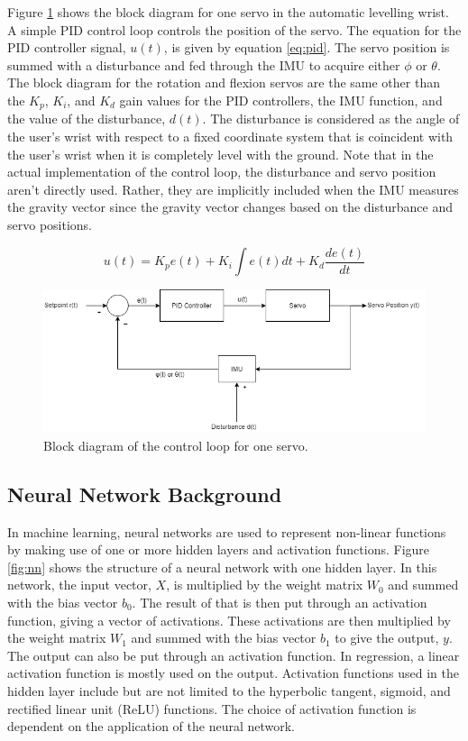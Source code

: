 \documentclass[letterpaper,12pt]{article}
\begin{document}
Figure \ref{fig:servo_system} shows the block diagram for one servo in the automatic levelling wrist. A simple PID control loop controls the position of the servo. The equation for the PID controller signal, $u(t)$, is given by equation \ref{eq:pid}. The servo position is summed with a disturbance and fed through the IMU to acquire either $\phi$ or $\theta$. The block diagram for the rotation and flexion servos are the same other than the $K_p$, $K_i$, and $K_d$ gain values for the PID controllers, the IMU function, and the value of the disturbance, $d(t)$. The disturbance is considered as the angle of the user's wrist with respect to a fixed coordinate system that is coincident with the user's wrist when it is completely level with the ground. Note that in the actual implementation of the control loop, the disturbance and servo position aren't directly used. Rather, they are implicitly included when the IMU measures the gravity vector since the gravity vector changes based on the disturbance and servo positions.

\begin{equation}
	\label{eq:pid}
	u(t) = K_p e(t) + K_i \int e(t) dt + K_d \frac{de(t)}{dt}
\end{equation}

\begin{figure}[H]
\centering \includegraphics[width=0.8\columnwidth]{servo_system.png}
\caption{\label{fig:servo_system}Block diagram of the control loop for one servo.}
\end{figure}

\subsection{Neural Network Background}
In machine learning, neural networks are used to represent non-linear functions by making use of one or more hidden layers and activation functions. Figure \ref{fig:nn} shows the structure of a neural network with one hidden layer. In this network, the input vector, $X$, is multiplied by the weight matrix $W_{0}$ and summed with the bias vector $b_{0}$. The result of that is then put through an activation function, giving a vector of activations. These activations are then multiplied by the weight matrix $W_{1}$ and summed with the bias vector $b_{1}$ to give the output, $y$. The output can also be put through an activation function. In regression, a linear activation function is mostly used on the output. Activation functions used in the hidden layer include but are not limited to the hyperbolic tangent, sigmoid, and rectified linear unit (ReLU) functions. The choice of activation function is dependent on the application of the neural network.
\end{document}
